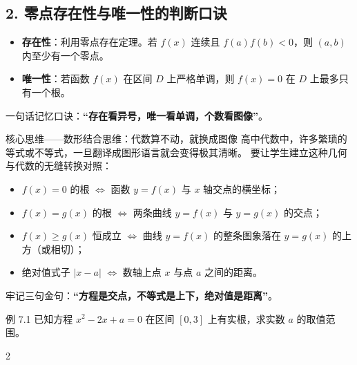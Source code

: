 \documentclass[11pt,a4paper]{ctexart}
\begin{document}
\subsection{2. 零点存在性与唯一性的判断口诀}
\begin{itemize}
  \item \textbf{存在性}：利用零点存在定理。若 $f(x)$ 连续且 $f(a)f(b)<0$，则 $(a,b)$ 内至少有一个零点。
  \item \textbf{唯一性}：若函数 $f(x)$ 在区间 $D$ 上严格单调，则 $f(x)=0$ 在 $D$ 上最多只有一个根。
\end{itemize}
一句话记忆口诀：\textbf{“存在看异号，唯一看单调，个数看图像”}。

\begin{keybox}{核心思维——数形结合思维：代数算不动，就换成图像}
高中代数中，许多繁琐的等式或不等式，一旦翻译成图形语言就会变得极其清晰。
要让学生建立这种几何与代数的无缝转换对照：
\begin{itemize}
  \item $f(x) = 0$ 的根 $\Longleftrightarrow$ 函数 $y=f(x)$ 与 $x$ 轴交点的横坐标；
  \item $f(x) = g(x)$ 的根 $\Longleftrightarrow$ 两条曲线 $y=f(x)$ 与 $y=g(x)$ 的交点；
  \item $f(x) \ge g(x)$ 恒成立 $\Longleftrightarrow$ 曲线 $y=f(x)$ 的整条图象落在 $y=g(x)$ 的上方（或相切）；
  \item 绝对值式子 $|x-a|$ $\Longleftrightarrow$ 数轴上点 $x$ 与点 $a$ 之间的距离。
\end{itemize}
牢记三句金句：\textbf{“方程是交点，不等式是上下，绝对值是距离”}。
\end{keybox}

\begin{exbox}{例 7.1}
已知方程 $x^2-2x+a=0$ 在区间 $[0,3]$ 上有实根，求实数 $a$ 的取值范围。
\end{exbox}

\begin{paracol}{2}
\switchcolumn
{}
\end{paracol}
\end{document}
